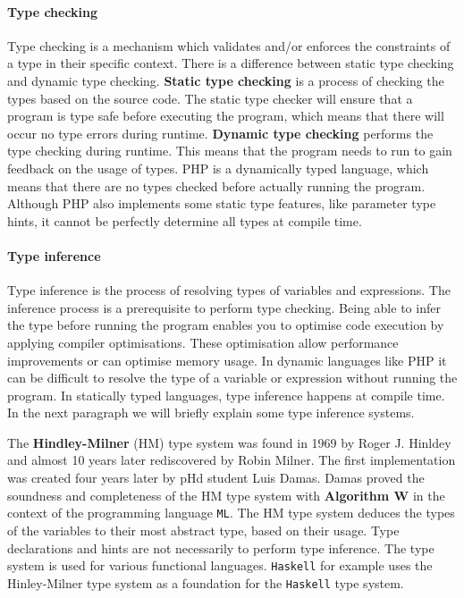 \documentclass[../main.tex]{subfiles}
\begin{document}
    \paragraph{Type checking}
    Type checking is a mechanism which validates and/or enforces the constraints of a type in their specific context.
    There is a difference between static type checking and dynamic type checking.
    \textbf{Static type checking} is a process of checking the types based on the source code.
    The static type checker will ensure that a program is type safe before executing the program, which means that there will occur no type errors during runtime.
    \textbf{Dynamic type checking} performs the type checking during runtime.
    This means that the program needs to run to gain feedback on the usage of types.
    PHP is a dynamically typed language, which means that there are no types checked before actually running the program.
    Although PHP also implements some static type features, like parameter type hints, it cannot be perfectly determine all types at compile time.
        
    \paragraph{Type inference}
    Type inference is the process of resolving types of variables and expressions.
    The inference process is a prerequisite to perform type checking.
    Being able to infer the type before running the program enables you to optimise code execution by applying compiler optimisations.
    These optimisation allow performance improvements or can optimise memory usage.
    In dynamic languages like PHP it can be difficult to resolve the type of a variable or expression without running the program.
    In statically typed languages, type inference happens at compile time.
    In the next paragraph we will briefly explain some type inference systems.
    
    The \textbf{Hindley-Milner}\cite{Hin:69} (HM) type system was found in 1969 by Roger J. Hinldey and almost 10 years later rediscovered\cite{Mil:78} by Robin Milner.
    The first implementation was created four years later by pHd student Luis Damas.
    Damas proved the soundness and completeness of the HM type system with \textbf{Algorithm W}\cite{Dam:82}  in the context of the programming language \texttt{ML}.
    The HM type system deduces the types of the variables to their most abstract type, based on their usage.
    Type declarations and hints are not necessarily to perform type inference.
    The type system is used for various functional languages. 
    \texttt{Haskell} for example uses the Hinley-Milner type system as a foundation for the \texttt{Haskell} type system. 
    
\end{document}

